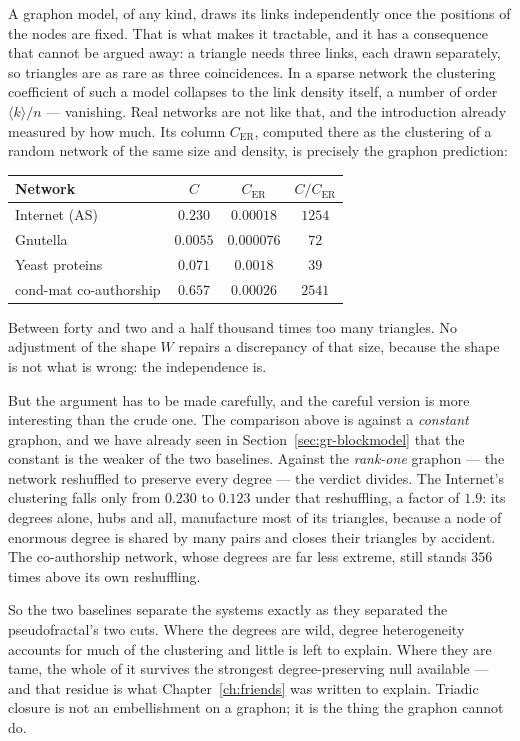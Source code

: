 A graphon model, of any kind, draws its links independently once the positions of
the nodes are fixed. That is what makes it tractable, and it has a consequence
that cannot be argued away: a triangle needs three links, each drawn separately,
so triangles are as rare as three coincidences. In a sparse network the clustering
coefficient of such a model collapses to the link density itself, a number of
order $\langle k\rangle/n$ --- vanishing. Real networks are not like that, and the
introduction already measured by how much. Its column $C_{\mathrm{ER}}$, computed
there as the clustering of a random network of the same size and density, is
precisely the graphon prediction:

\begin{center}
\begin{tabular}{lccc}
\hline
Network & $C$ & $C_{\mathrm{ER}}$ & $C/C_{\mathrm{ER}}$ \\
\hline
Internet (AS)          & $0.230$  & $0.00018$ & $1254$ \\
Gnutella               & $0.0055$ & $0.000076$ & $72$ \\
Yeast proteins         & $0.071$  & $0.0018$  & $39$ \\
cond-mat co-authorship & $0.657$  & $0.00026$ & $2541$ \\
\hline
\end{tabular}
\end{center}

Between forty and two and a half thousand times too many triangles. No adjustment
of the shape $W$ repairs a discrepancy of that size, because the shape is not what
is wrong: the independence is.

But the argument has to be made carefully, and the careful version is more
interesting than the crude one. The comparison above is against a \emph{constant}
graphon, and we have already seen in
Section~\ref{sec:gr-blockmodel} that the constant is the weaker of the two
baselines. Against the \emph{rank-one} graphon --- the network reshuffled to
preserve every degree --- the verdict divides. The Internet's clustering falls only
from $0.230$ to $0.123$ under that reshuffling, a factor of $1.9$: its degrees
alone, hubs and all, manufacture most of its triangles, because a node of enormous
degree is shared by many pairs and closes their triangles by accident. The
co-authorship network, whose degrees are far less extreme, still stands $356$ times
above its own reshuffling.

So the two baselines separate the systems exactly as they separated the
pseudofractal's two cuts. Where the degrees are wild, degree heterogeneity accounts
for much of the clustering and little is left to explain. Where they are tame, the
whole of it survives the strongest degree-preserving null available --- and that
residue is what Chapter~\ref{ch:friends} was written to explain. Triadic closure is
not an embellishment on a graphon; it is the thing the graphon cannot do.

